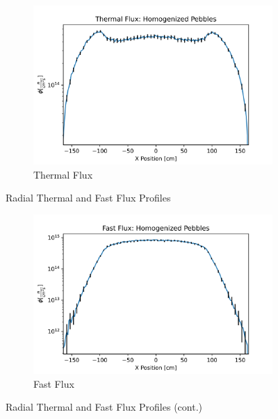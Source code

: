 \begin{figure}[H]
\centering

\begin{subfigure}{0.9\textwidth}
  \includegraphics[width=0.95\linewidth]{figures/therm_flux_homog.png}
  \caption{Thermal Flux}
  \label{fig:hom-det-xy-therm}
\end{subfigure}%

\caption{Radial Thermal and Fast Flux Profiles}
\end{figure}

\begin{figure}[H]\ContinuedFloat
\centering

\begin{subfigure}{0.9\textwidth}
  \includegraphics[width=0.95\linewidth]{figures/fast_flux_homog.png}
  \caption{Fast Flux}
  \label{fig:hom-det-xy-fast}
\end{subfigure}

%
\caption{Radial Thermal and Fast Flux Profiles (cont.)}
\label{fig:hom-det-xy}
\end{figure}